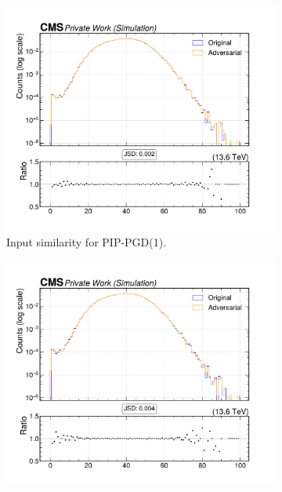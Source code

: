 \begin{figure}[htbp]
  \centering
  \begin{subfigure}[t]{0.32\textwidth}
    \includegraphics[width=\linewidth]{media/output/features/compare/combined_it_1/cmp_global_features_npv.pdf}
    \caption*{Input similarity for PIP-PGD(1).}
  \end{subfigure}\hfill
  \begin{subfigure}[t]{0.32\textwidth}
    \includegraphics[width=\linewidth]{media/output/features/compare/combined_it_2/cmp_global_features_npv.pdf}

\end{subfigure}
\end{figure}
